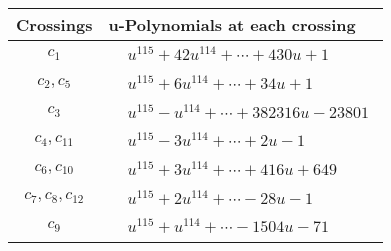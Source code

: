 \documentclass[1p]{elsarticle_modified}
\theoremstyle{definition}
\begin{document}
\begin{tabular}{m{50pt}|m{274pt}}
Crossings & \hspace{64pt}u-Polynomials at each crossing \\
\hline $$\begin{aligned}c_{1}\end{aligned}$$&$\begin{aligned}
&u^{115}+42 u^{114}+\cdots+430 u+1
\end{aligned}$\\
\hline $$\begin{aligned}c_{2},c_{5}\end{aligned}$$&$\begin{aligned}
&u^{115}+6 u^{114}+\cdots+34 u+1
\end{aligned}$\\
\hline $$\begin{aligned}c_{3}\end{aligned}$$&$\begin{aligned}
&u^{115}- u^{114}+\cdots+382316 u-23801
\end{aligned}$\\
\hline $$\begin{aligned}c_{4},c_{11}\end{aligned}$$&$\begin{aligned}
&u^{115}-3 u^{114}+\cdots+2 u-1
\end{aligned}$\\
\hline $$\begin{aligned}c_{6},c_{10}\end{aligned}$$&$\begin{aligned}
&u^{115}+3 u^{114}+\cdots+416 u+649
\end{aligned}$\\
\hline $$\begin{aligned}c_{7},c_{8},c_{12}\end{aligned}$$&$\begin{aligned}
&u^{115}+2 u^{114}+\cdots-28 u-1
\end{aligned}$\\
\hline $$\begin{aligned}c_{9}\end{aligned}$$&$\begin{aligned}
&u^{115}+u^{114}+\cdots-1504 u-71
\end{aligned}$\\
\hline
\end{tabular}\\~\\
\newpage\renewcommand{\arraystretch}{1}
\end{document}

